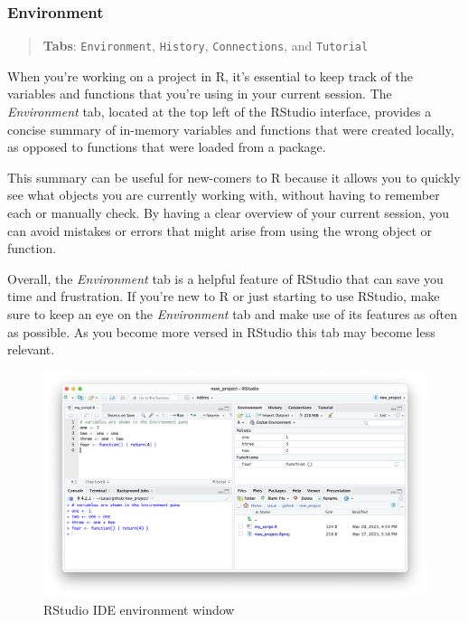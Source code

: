 \documentclass[
]{book}
\begin{document}
\hypertarget{environment}{%
\subsubsection*{Environment}\label{environment}}

\begin{quote}
\textbf{Tabs}: \texttt{Environment}, \texttt{History}, \texttt{Connections}, and \texttt{Tutorial}
\end{quote}

When you're working on a project in R, it's essential to keep track of the variables and functions that you're using in your current session. The \emph{Environment} tab, located at the top left of the RStudio interface, provides a concise summary of in-memory variables and functions that were created locally, as opposed to functions that were loaded from a package.

This summary can be useful for new-comers to R because it allows you to quickly see what objects you are currently working with, without having to remember each or manually check. By having a clear overview of your current session, you can avoid mistakes or errors that might arise from using the wrong object or function.

Overall, the \emph{Environment} tab is a helpful feature of RStudio that can save you time and frustration. If you're new to R or just starting to use RStudio, make sure to keep an eye on the \emph{Environment} tab and make use of its features as often as possible. As you become more versed in RStudio this tab may become less relevant.

\begin{figure}
\includegraphics[width=31.94in]{images/02_025_environment} \caption{\label{fig:2025}RStudio IDE environment window}\label{fig:2025}
\end{figure}
\end{document}

